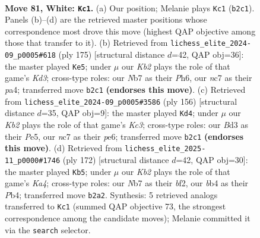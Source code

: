 \documentclass[11pt]{article}
\begin{document}
\clearpage

\begin{figure}[p]\centering
\begin{subfigure}{0.46\textwidth}\centering
\resizebox{\linewidth}{!}{%
\newchessgame
\chessboard[
  setfen={8/1Nn5/6n1/p7/Pb1pPk2/1P1B3p/1K2P3/8 w - - 28 81},
  showmover=false,
  pgfstyle=straightmove, color=movearrow, markmove={b2-c1}
]}
\caption{}
\end{subfigure}\hfill
\begin{subfigure}{0.46\textwidth}\centering
\resizebox{\linewidth}{!}{%
\newchessgame
\chessboard[
  setfen={8/8/1K1k3p/p1p3p1/PbB3P1/4PP2/8/8 b - - 23 88},
  showmover=false,
  pgfstyle=straightmove, color=movearrow, markmove={d6-e5}
]}
\caption{}
\end{subfigure}
\\[4pt]
\begin{subfigure}{0.46\textwidth}\centering
\resizebox{\linewidth}{!}{%
\newchessgame
\chessboard[
  setfen={8/8/p3pBk1/Pb2P2p/1P5P/2K5/8/8 w - - 38 79},
  showmover=false,
  pgfstyle=straightmove, color=movearrow, markmove={c3-d4}
]}
\caption{}
\end{subfigure}\hfill
\begin{subfigure}{0.46\textwidth}\centering
\resizebox{\linewidth}{!}{%
\newchessgame
\chessboard[
  setfen={8/1p6/1p1k4/3P3p/KPP2p1P/8/5b2/7B w - - 1 87},
  showmover=false,
  pgfstyle=straightmove, color=movearrow, markmove={a4-b5}
]}
\caption{}
\end{subfigure}
\caption{\textbf{Move 81, White: \texttt{Kc1}.} (a) Our position; Melanie plays \texttt{Kc1} (\texttt{b2c1}). Panels (b)--(d) are the retrieved master positions whose correspondence most drove this move (highest QAP objective among those that transfer to it). (b) Retrieved from \texttt{lichess\_elite\_2024-09\_p0005\#618} (ply 175) [structural distance $d$=42, QAP obj=36]: the master played \texttt{Ke5}; under $\mu$ our \emph{Kb2} plays the role of that game's \emph{Kd3}; cross-type roles: our \emph{N}b7 as their \emph{P}h6, our \emph{n}c7 as their \emph{p}a4; transferred move \texttt{b2c1} \textbf{(endorses this move)}. (c) Retrieved from \texttt{lichess\_elite\_2024-09\_p0005\#3586} (ply 156) [structural distance $d$=35, QAP obj=9]: the master played \texttt{Kd4}; under $\mu$ our \emph{Kb2} plays the role of that game's \emph{Kc3}; cross-type roles: our \emph{B}d3 as their \emph{P}e5, our \emph{n}c7 as their \emph{p}e6; transferred move \texttt{b2c1} \textbf{(endorses this move)}. (d) Retrieved from \texttt{lichess\_elite\_2025-11\_p0000\#1746} (ply 172) [structural distance $d$=42, QAP obj=30]: the master played \texttt{Kb5}; under $\mu$ our \emph{Kb2} plays the role of that game's \emph{Ka4}; cross-type roles: our \emph{N}b7 as their \emph{b}f2, our \emph{b}b4 as their \emph{P}b4; transferred move \texttt{b2a2}. Synthesis: 5 retrieved analogs transferred to \texttt{Kc1} (summed QAP objective 73, the strongest correspondence among the candidate moves); Melanie committed it via the \texttt{search} selector.}
\label{fig:thought-m160}
\end{figure}
\end{document}
